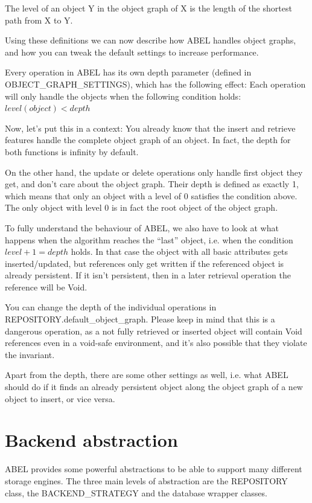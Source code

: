 The level of an object Y in the object graph of X is the length of the shortest path from X to Y.

Using these definitions we can now describe how ABEL handles object graphs, and how you can tweak the default settings to increase performance.

Every operation in ABEL has its own depth parameter (defined in OBJECT\_GRAPH\_SETTINGS), which has the following effect:
Each operation will only handle the objects when the following condition holds: $ level(object) < depth $

Now, let's put this in a context:
You already know that the insert and retrieve features handle the complete object graph of an object. 
In fact, the depth for both functions is infinity by default.

On the other hand, the update or delete operations only handle first object they get, and don't care about the object graph.
Their depth is defined as exactly 1, which means that only an object with a level of 0 satisfies the condition above.
The only object with level 0 is in fact the root object of the object graph.

To fully understand the behaviour of ABEL, we also have to look at what happens when the algorithm reaches the ``last'' object, i.e. when the condition $level + 1 = depth$ holds.
In that case the object with all basic attributes gets inserted/updated, but references only get written if the referenced object is already persistent.
If it isn't persistent, then in a later retrieval operation the reference will be Void.

You can change the depth of the individual operations in REPOSITORY.default\_object\_graph. 
Please keep in mind that this is a dangerous operation, as a not fully retrieved or inserted object will contain Void references even in a void-safe environment, and it's also possible that they violate the invariant.

Apart from the depth, there are some other settings as well, i.e. what ABEL should do if it finds an already persistent object along the object graph of a new object to insert, or vice versa.

\section{Backend abstraction}

ABEL provides some powerful abstractions to be able to support many different storage engines. 
The three main levels of abstraction are the REPOSITORY class, the BACKEND\_STRATEGY and the database wrapper classes.

